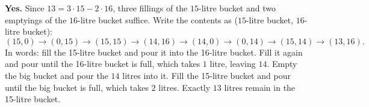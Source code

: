 \textbf{Yes.} Since $13=3\cdot15-2\cdot16$, three fillings of the $15$-litre bucket and two emptyings of the $16$-litre bucket suffice. Write the contents as ($15$-litre bucket, $16$-litre bucket):
\[
(15,0)\to(0,15)\to(15,15)\to(14,16)\to(14,0)\to(0,14)\to(15,14)\to(13,16).
\]
In words: fill the 15-litre bucket and pour it into the 16-litre bucket. Fill it again and pour until the 16-litre bucket is full, which takes $1$ litre, leaving $14$. Empty the big bucket and pour the $14$ litres into it. Fill the 15-litre bucket and pour until the big bucket is full, which takes $2$ litres. Exactly $\boxed{13}$ litres remain in the 15-litre bucket.
